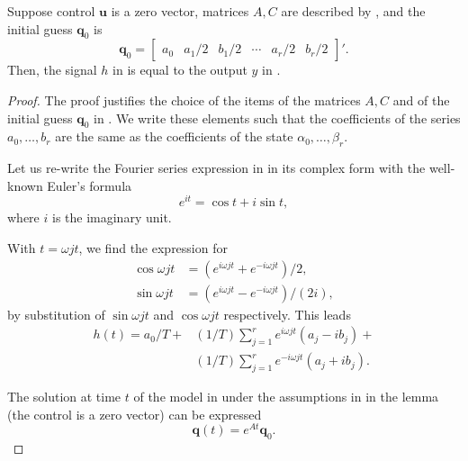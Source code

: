 \begin{highlight}
\begin{lem}\label{lem:eqv}Suppose control $\mathbf{u}$ is a zero vector, matrices $A,C$ are described by , and the initial guess $\mathbf{q}_0$ is 
  \begin{equation*}
  \mathbf{q}_0=\begin{bmatrix}a_0 & a_1/2 & b_1/2 & \cdots & a_r/2 & b_r/2\end{bmatrix}'.
  \end{equation*} 
  Then, the signal $h$ in  is equal to the output $y$ in .
\end{lem}
\end{highlight}

\begin{proof}
The proof justifies the choice of the items of the matrices $A,C$ and of the initial guess $\mathbf{q}_0$ in . We write these elements such that the coefficients of the series $a_0,\dots,b_r$ are the same as the coefficients of the state $\alpha_0,\dots,\beta_r$.

Let us re-write the Fourier series expression in  in its complex form with the well-known Euler's formula 
\begin{equation}
  e^{it}=\cos{t}+i\sin{t},
\end{equation} 
where $i$ is the imaginary unit.

With $t=\omega jt$, we find the expression for 
\begin{subequations}\begin{align}
  \cos{\omega jt}&=(e^{i\omega jt}+e^{-i\omega jt})/2,\\  
  \sin{\omega jt}&=(e^{i\omega jt}-e^{-i\omega jt})/(2i),
\end{align}\end{subequations}
by substitution of $\sin{\omega jt}$ and $\cos{\omega jt}$ respectively. This leads~\citep{kuo1967automatic}
\begin{equation}\begin{split}\label{eq:proof-complex}
  h(t)=a_0/T+&(1/T)\sum_{j=1}^{r}{e^{i\omega jt}(a_j-ib_j)}+\\&(1/T)\sum_{j=1}^{r}{e^{-i\omega jt}(a_j+ib_j)}.
 \end{split}\end{equation} 

The solution at time $t$ of the model in  under the assumptions in in the lemma (the control is a zero vector) can be expressed
\begin{equation}
  \mathbf{q}(t)=e^{At}\mathbf{q}_0.
\end{equation}


\end{proof}
